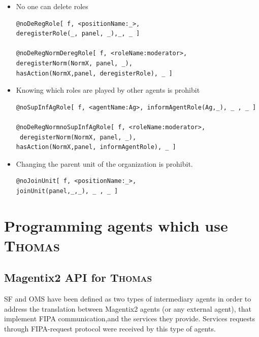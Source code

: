\begin{enumerate}
\begin{itemize}
\begin{itemize}
\item No one can delete roles
\begin{verbatim}
@noDeRegRole[ f, <positionName:_>, 
deregisterRole(_, panel, _),_, _ ] 

@noDeRegNormDeregRole[ f, <roleName:moderator>, 
deregisterNorm(NormX, panel, _),
hasAction(NormX,panel, deregisterRole), _ ] 
\end{verbatim}

\item Knowing which roles are played by other agents is prohibit
\begin{verbatim}
@noSupInfAgRole[ f, <agentName:Ag>, informAgentRole(Ag,_), _ , _ ] 

@noDeRegNormnoSupInfAgRole[ f, <roleName:moderator>,
 deregisterNorm(NormX, panel, _),
hasAction(NormX,panel, informAgentRole), _ ] 

\end{verbatim}

\item Changing the parent unit of the organization is prohibit.   
\begin{verbatim}
@noJoinUnit[ f, <positionName:_>, 
joinUnit(panel,_,_), _ , _ ] 
\end{verbatim}

\end{itemize}


\end{itemize}












\end{enumerate}




\section{Programming agents which use \textsc{Thomas}}\label{sec:programmingAgentsThomas}

\subsection{Magentix2 API for \textsc{Thomas}}\label{thomasAPI}
SF and OMS have been defined as two types of intermediary agents in order to address the translation between Magentix2 agents (or any external agent), that implement FIPA communication,and the services they provide. Services requests through FIPA-request protocol were received by this type of agents.

